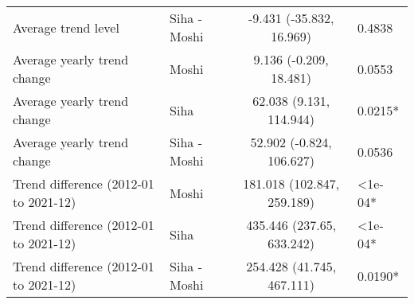 \begin{longtable}{l|lcl}
Average trend level & Siha - Moshi & -9.431 (-35.832, 16.969) & 0.4838 \\ 
Average yearly trend change & Moshi & 9.136 (-0.209, 18.481) & 0.0553 \\ 
Average yearly trend change & Siha & 62.038 (9.131, 114.944) & 0.0215* \\ 
Average yearly trend change & Siha - Moshi & 52.902 (-0.824, 106.627) & 0.0536 \\ 
Trend difference (2012-01 to 2021-12) & Moshi & 181.018 (102.847, 259.189) & <1e-04* \\ 
Trend difference (2012-01 to 2021-12) & Siha & 435.446 (237.65, 633.242) & <1e-04* \\ 
Trend difference (2012-01 to 2021-12) & Siha - Moshi & 254.428 (41.745, 467.111) & 0.0190* \\ 
\bottomrule
\end{longtable}
\endgroup

